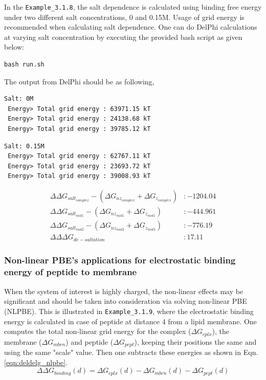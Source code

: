 \documentclass[9pt,tutorial]{livecoms}
\newcommand*\ttvar[1]{\texttt{\expandafter\dottvar\detokenize{#1}\relax}}
\newcommand*\dottvar[1]{\ifx\relax#1\else
  \expandafter\ifx\string_#1\string_\allowbreak\else#1\fi
  \expandafter\dottvar\fi}
\begin{document}
In the \texttt{Example\_3.1.8}, the salt dependence is calculated using binding free energy under two different salt concentrations, 0 and 0.15M. Usage of grid energy is recommended when calculating salt dependence. One can do DelPhi calculations at varying salt concentration by executing the provided bash script \ttvar{run.sh} as given below:

\begin{verbatim}
bash run.sh
\end{verbatim}

The output from DelPhi should be as following,

\begin{verbatim}
Salt: 0M 
 Energy> Total grid energy : 63971.15 kT
 Energy> Total grid energy : 24138.68 kT
 Energy> Total grid energy : 39785.12 kT
\end{verbatim}

\begin{verbatim}
Salt: 0.15M
 Energy> Total grid energy : 62767.11 kT
 Energy> Total grid energy : 23693.72 kT
 Energy> Total grid energy : 39008.93 kT
\end{verbatim}

\begin{equation}
\begin{aligned}
\Delta \Delta G_{salt_{complex}} - (\Delta G_{nz_{complex}} + \Delta G_{z_{complex}}) &: -1204.04 \nonumber \\
\Delta\Delta G_{salt_{mol1}} - (\Delta G_{nz_{mol1}} + \Delta G_{z_{mol1}}) &: -444.961 \nonumber \\
\Delta\Delta G_{salt_{mol2}} - (\Delta G_{nz_{mol2}} + \Delta G_{z_{mol2}}) &: -776.19 \nonumber \\
\Delta\Delta\Delta G_{de-saltation} &: 17.11 \nonumber 
\end{aligned}
\end{equation}

\subsubsection{Non-linear PBE's applications for electrostatic binding energy of peptide to membrane}
When the system of interest is highly charged, the non-linear effects may be significant and should be taken into consideration via solving non-linear PBE (NLPBE). This is illustrated in \texttt{Example\_3.1.9}, where the electrostatic binding energy is calculated in case of peptide at distance 4 \text{\AA} from a lipid membrane. One computes the total non-linear grid energy for the complex ($ \Delta G_{cplx}$), the membrane ($ \Delta G_{mbrn}$) and peptide ($ \Delta G_{pept} $), keeping their positions the same and using the same "scale" value. Then one subtracts these energies as shown in Eqn. \ref{eqn:deldelg_nlpbe}.
\begin{equation}\label{eqn:deldelg_nlpbe}
\Delta\Delta G_{binding}(d) = \Delta G_{cplx}(d) - \Delta G_{mbrn}(d) - \Delta G_{pept}(d)
\end{equation}
\end{document}
